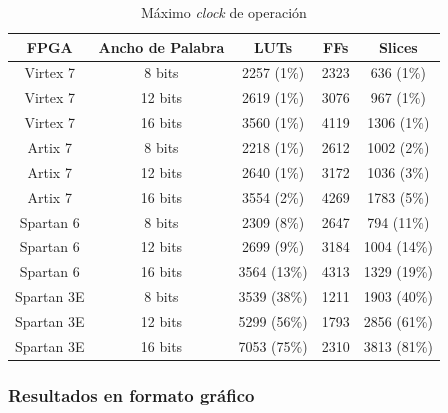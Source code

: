 \begin{table}[htb!]
    \begin{center}
      \small
        \begin{tabular}{|c|c|c|c|c|}
        \hline  
        \textbf{FPGA} & \textbf{Ancho de Palabra} & \textbf{LUTs} & \textbf{FFs} & \textbf{Slices} \\
        \hline
        \hline
        Virtex 7      & 8 bits                    & 2257 (1\%)    & 2323         & 636  (1\%)  \\ \hline
        Virtex 7      & 12 bits                   & 2619 (1\%)    & 3076         & 967  (1\%)  \\ \hline
        Virtex 7      & 16 bits                   & 3560 (1\%)    & 4119         & 1306 (1\%)  \\ \hline
        Artix 7       & 8 bits                    & 2218 (1\%)    & 2612         & 1002 (2\%)  \\ \hline
        Artix 7       & 12 bits                   & 2640 (1\%)    & 3172         & 1036 (3\%)  \\ \hline
        Artix 7       & 16 bits                   & 3554 (2\%)    & 4269         & 1783 (5\%)  \\ \hline
        Spartan 6     & 8 bits                    & 2309 (8\%)    & 2647         & 794  (11\%) \\ \hline
        Spartan 6     & 12 bits                   & 2699 (9\%)    & 3184         & 1004 (14\%) \\ \hline
        Spartan 6     & 16 bits                   & 3564 (13\%)   & 4313         & 1329 (19\%) \\ \hline
        Spartan 3E    & 8 bits                    & 3539 (38\%)   & 1211         & 1903 (40\%) \\ \hline
        Spartan 3E    & 12 bits                   & 5299 (56\%)   & 1793         & 2856 (61\%) \\ \hline
        Spartan 3E    & 16 bits                   & 7053 (75\%)   & 2310         & 3813 (81\%) \\ \hline
        \end{tabular}
        \caption{Máximo \textit{clock} de operación}
      \normalsize
    \end{center}
\end{table}

\subsubsection{Resultados en formato gráfico}

